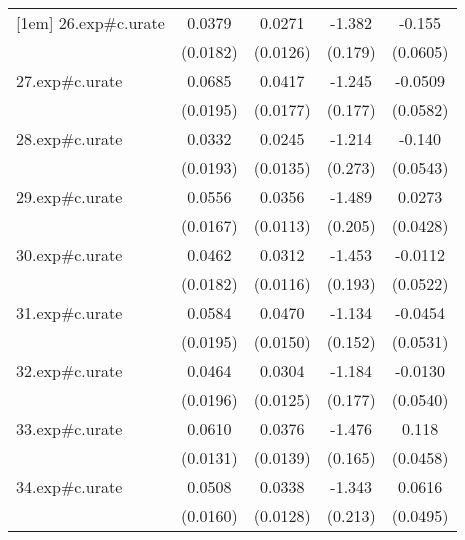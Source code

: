 {\begin{tabular}{l*{4}{c}}
[1em]
26.exp#c.urate&      0.0379\sym{*}  &      0.0271\sym{*}  &      -1.382\sym{***}&      -0.155\sym{*}  \\
            &    (0.0182)         &    (0.0126)         &     (0.179)         &    (0.0605)         \\
[1em]
27.exp#c.urate&      0.0685\sym{***}&      0.0417\sym{*}  &      -1.245\sym{***}&     -0.0509         \\
            &    (0.0195)         &    (0.0177)         &     (0.177)         &    (0.0582)         \\
[1em]
28.exp#c.urate&      0.0332         &      0.0245         &      -1.214\sym{***}&      -0.140\sym{*}  \\
            &    (0.0193)         &    (0.0135)         &     (0.273)         &    (0.0543)         \\
[1em]
29.exp#c.urate&      0.0556\sym{**} &      0.0356\sym{**} &      -1.489\sym{***}&      0.0273         \\
            &    (0.0167)         &    (0.0113)         &     (0.205)         &    (0.0428)         \\
[1em]
30.exp#c.urate&      0.0462\sym{*}  &      0.0312\sym{**} &      -1.453\sym{***}&     -0.0112         \\
            &    (0.0182)         &    (0.0116)         &     (0.193)         &    (0.0522)         \\
[1em]
31.exp#c.urate&      0.0584\sym{**} &      0.0470\sym{**} &      -1.134\sym{***}&     -0.0454         \\
            &    (0.0195)         &    (0.0150)         &     (0.152)         &    (0.0531)         \\
[1em]
32.exp#c.urate&      0.0464\sym{*}  &      0.0304\sym{*}  &      -1.184\sym{***}&     -0.0130         \\
            &    (0.0196)         &    (0.0125)         &     (0.177)         &    (0.0540)         \\
[1em]
33.exp#c.urate&      0.0610\sym{***}&      0.0376\sym{**} &      -1.476\sym{***}&       0.118\sym{*}  \\
            &    (0.0131)         &    (0.0139)         &     (0.165)         &    (0.0458)         \\
[1em]
34.exp#c.urate&      0.0508\sym{**} &      0.0338\sym{*}  &      -1.343\sym{***}&      0.0616         \\
            &    (0.0160)         &    (0.0128)         &     (0.213)         &    (0.0495)         \\

\end{tabular}}
